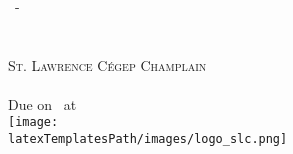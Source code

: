 
\singlespacing
\begin{titlepage}
    \begin{center}
        \vspace*{0.5in}
        \LARGE{\textsc{\docTitle}}\\
        \vspace*{0.1in}
        \Large{\textsc{\docSubtitle}}\\
        \vfill
        \Large{\textsc{\docAuthorTitlePage}}\\
        \vspace*{0.1in}
        \Large{\textsc{\docClass\ -\ \docClassNumber}}\\
        \vfill
        \Large{\docClassSection}\\
        \vspace*{0.1in}
        \large{\textsc{\docClassInstructor}}\\
        \vfill
        \large{\textsc{St. Lawrence Cégep Champlain}}\\
        \vspace*{0.1in}
        \small{\docClassSemester }\\
        \small{Due on \docDueDate\ at \docDueTime}\\
        \vfill
        \texttt{[image: \\latexTemplatesPath/images/logo\_slc.png]}
        \vfill
    \end{center}
\end{titlepage}
\pagebreak
{}\tableofcontents\pagebreak
\doublespacing

